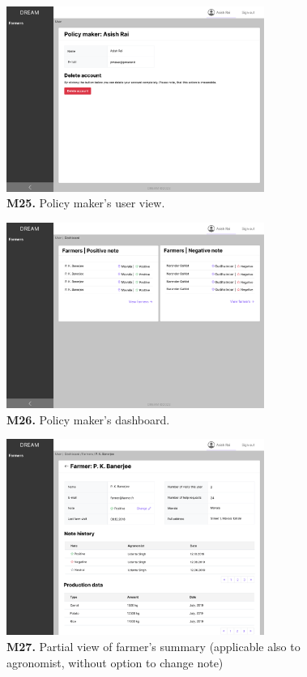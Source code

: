 \begin{figure}[H]
    \centering
    \includegraphics[width=0.75\textwidth]{mockups/Policy maker_User.png}
    \caption{\textbf{M25.} Policy maker's user view.}
\end{figure}

\begin{figure}[H]
    \centering
    \includegraphics[width=0.75\textwidth]{mockups/Policy maker_Dashboard.png}
    \caption{\textbf{M26.} Policy maker's dashboard.}
\end{figure}

\begin{figure}[H]
    \centering
    \includegraphics[width=0.75\textwidth]{mockups/Policy maker_Dashboard_Farmers_Farmer_part1.png}
    \caption{\textbf{M27.} Partial view of farmer's summary (applicable also to agronomist, without option to change note)}
\end{figure}

